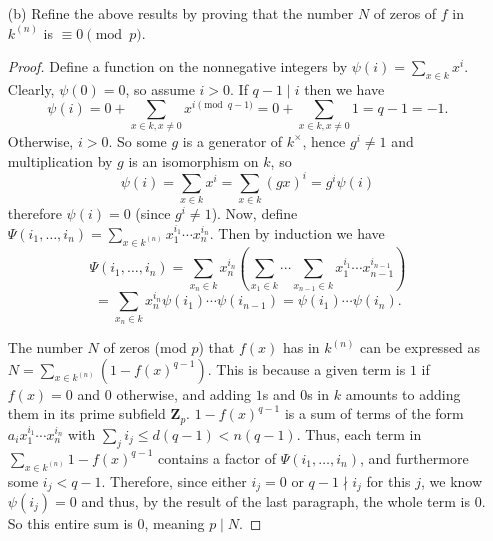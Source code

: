 \documentclass[10pt]{article}
\newcommand{\Z}{\mathbf{Z}}
\renewcommand{\bar}{\overline}
\begin{document}
\begin{enumerate}
\begin{enumerate}
\begin{proof}
Consider the polynomials $F(X) = 1 - f(X)^{q-1}$ and $G(X) = \prod_i (1-X_i^{q-1})$, which have degrees $d(q-1)$ and $n(q-1)$, respectively.  These both induce the indicator function that is $1$ at $x = 0$ and $0$ elsewhere.  Let $\bar{F}(X)$ be the reduced polynomial belonging to $F(X)$.  Then the degree of $\bar{F}(X) - G(X)$ in each variable is $<q$ and this polynomial induces the $0$ function on $k^{(n)}$.  Thus, $\bar{F}(X) = G(X)$.  Since $\bar{F}(X)$ is the reduced version of $F(X)$, we have $n(q-1) = \deg G = \deg \bar{F} \leq \deg F = d(q-1)$.  Since $q \geq 2$, this contradicts that $n > d$.
\end{proof}

\item[(b)] Refine the above results by proving that the number $N$ of zeros of $f$ in $k^{(n)}$ is $\equiv 0 \pmod{p}$.

\begin{proof}
Define a function on the nonnegative integers by $\psi(i) = \sum\limits_{x \in k} x^i$.  Clearly, $\psi(0) = 0$, so assume $i > 0$.  If $q-1 \mid i$ then we have $$\psi(i) = 0 + \sum\limits_{x \in k, x \neq 0} x^{i\pmod{q-1}} = 0 + \sum\limits_{x \in k, x \neq 0} 1 = q - 1 = -1.$$  Otherwise, $i > 0$.  So some $g$ is a generator of $k^{\times}$, hence $g^i \neq 1$ and multiplication by $g$ is an isomorphism on $k$, so
$$
\psi(i) = \sum_{x \in k} x^i = \sum_{x \in k}(gx)^i = g^i \psi(i)
$$
therefore $\psi(i) = 0$ (since $g^i \neq 1$).  Now, define $\Psi(i_1, \dots , i_n) = \sum\limits_{x \in k^{(n)}} x_1^{i_1} \cdots x_n^{i_n}$.  Then by induction we have
$$
\Psi(i_1, \dots , i_n) = \sum\limits_{x_n \in k} x_n^{i_n} \left(\sum_{x_1 \in k} \cdots \sum_{x_{n-1} \in k} x_1^{i_1} \cdots x_{n-1}^{i_{n-1}} \right)
$$
$$=\sum\limits_{x_n \in k} x_n^{i_n} \psi(i_1) \cdots \psi(i_{n-1}) = \psi(i_1) \cdots \psi(i_n).
$$

The number $N$ of zeros (mod $p$) that $f(x)$ has in $k^{(n)}$ can be expressed as $N = \sum\limits_{x \in k^{(n)}}(1 - f(x)^{q-1})$.  This is because a given term is $1$ if $f(x) = 0$ and $0$ otherwise, and adding $1$s and $0$s in $k$ amounts to adding them in its prime subfield $\Z_p$.  $1-f(x)^{q-1}$ is a sum of terms of the form $a_ix_1^{i_1} \cdots x_n^{i_n}$ with $\sum\limits_j i_j \leq d(q-1) < n(q-1)$.  Thus, each term in $\sum\limits_{x \in k^{(n)}} 1 - f(x)^{q-1}$ contains a factor of $\Psi(i_1, \dots , i_n)$, and furthermore some $i_j < q-1$.  Therefore, since either $i_j = 0$ or $q-1 \nmid i_j$ for this $j$, we know $\psi(i_j) = 0$ and thus, by the result of the last paragraph, the whole term is $0$.  So this entire sum is $0$, meaning $p \mid N$.
\end{proof}


\end{enumerate}
\end{enumerate}
\end{document}
